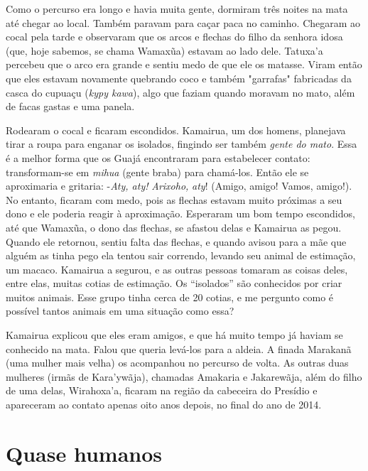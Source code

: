 Como o percurso era longo e havia muita gente, dormiram três noites na
mata até chegar ao local. Também paravam para caçar paca no caminho.
Chegaram ao cocal pela tarde e observaram que os arcos e flechas do
filho da senhora idosa (que, hoje sabemos, se chama Wamaxũa) estavam ao
lado dele. Tatuxa'a percebeu que o arco era grande e sentiu medo de que
ele os matasse. Viram então que eles estavam novamente quebrando coco e
também "garrafas" fabricadas da casca do cupuaçu (\emph{kypy kawa}),
algo que faziam quando moravam no mato, além de facas gastas e uma
panela.

Rodearam o cocal e ficaram escondidos. Kamairua, um dos homens,
planejava tirar a roupa para enganar os isolados, fingindo ser também
\emph{gente do mato}. Essa é a melhor forma que os Guajá encontraram
para estabelecer contato: transformam-se em \emph{mihua} (gente braba)
para chamá-los. Então ele se aproximaria e gritaria: -\emph{Aty, aty!}
\emph{Arixoho,} \emph{aty}! (Amigo, amigo! Vamos, amigo!). No entanto,
ficaram com medo, pois as flechas estavam muito próximas a seu dono e
ele poderia reagir à aproximação. Esperaram um bom tempo escondidos, até
que Wamaxũa, o dono das flechas, se afastou delas e Kamairua as pegou.
Quando ele retornou, sentiu falta das flechas, e quando avisou para a
mãe que alguém as tinha pego ela tentou sair correndo, levando seu
animal de estimação, um macaco. Kamairua a segurou, e as outras pessoas
tomaram as coisas deles, entre elas, muitas cotias de estimação. Os
``isolados'' são conhecidos por criar muitos animais. Esse grupo tinha
cerca de 20 cotias, e me pergunto como é possível tantos animais em uma
situação como essa?

Kamairua explicou que eles eram amigos, e que há muito tempo já haviam
se conhecido na mata. Falou que queria levá-los para a aldeia. A finada
Marakanã (uma mulher mais velha) os acompanhou no percurso de volta. As
outras duas mulheres (irmãs de Kara'ywãja), chamadas Amakaria e
Jakarewãja, além do filho de uma delas, Wirahoxa'a, ficaram na região da
cabeceira do Presídio e apareceram ao contato apenas oito anos depois,
no final do ano de 2014.

\section{Quase humanos}

